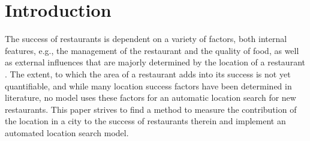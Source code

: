 \documentclass[a4paper, 11pt, oneside]{Thesis}  %
\begin{document}
{

}

{
}





\mainmatter	  %
\pagestyle{fancy}  %


\chapter{Introduction}
\label{Introduction}

The success of restaurants is dependent on a variety of factors, both internal features, e.g., the management of the restaurant and the quality of food, as well as external influences that are majorly determined by the location of a restaurant \cite{Parsa.2005}. The extent, to which the area of a restaurant adds into its success is not yet quantifiable, and while many location success factors have been determined in literature, no model uses these factors for an automatic location search for new restaurants. This paper strives to find a method to measure the contribution of the location in a city to the success of restaurants therein and implement an automated location search model.
\end{document}
